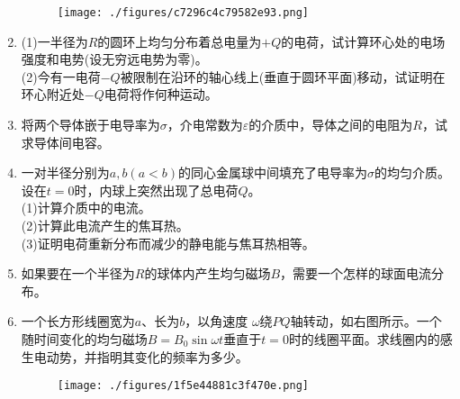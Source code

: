 \begin{enumerate}
\begin{figure}[ht]
\centering
\texttt{[image: ./figures/c7296c4c79582e93.png]}
\caption{} \label{fig_HGD04_5}
\end{figure}
\item (1)一半径为$R$的圆环上均匀分布着总电量为$+Q$的电荷，试计算环心处的电场强度和电势(设无穷远电势为零)。\\
(2)今有一电荷$-Q$被限制在沿环的轴心线上(垂直于圆环平面)移动，试证明在环心附近处$-Q$电荷将作何种运动。
\item 将两个导体嵌于电导率为$\sigma$，介电常数为$\varepsilon$的介质中，导体之间的电阻为$R$，试求导体间电容。
\item 一对半径分别为$a,b(a<b)$的同心金属球中间填充了电导率为$\sigma$的均匀介质。设在$t=0$时，内球上突然出现了总电荷$Q$。\\
(1)计算介质中的电流。\\
(2)计算此电流产生的焦耳热。\\
(3)证明电荷重新分布而减少的静电能与焦耳热相等。
\item 如果要在一个半径为$R$的球体内产生均匀磁场$B$，需要一个怎样的球面电流分布。
\item 一个长方形线圈宽为$ a$、长为$ b$，以角速度 $\omega$绕$PQ$轴转动，如右图所示。一个随时间变化的均匀磁场$B=B_0\sin \omega t$垂直于$t=0$时的线圈平面。求线圈内的感生电动势，并指明其变化的频率为多少。
 \begin{figure}[ht]
 \centering
 \texttt{[image: ./figures/1f5e44881c3f470e.png]}
 \caption{} \label{fig_HGD04_6}
 \end{figure}
\end{enumerate}